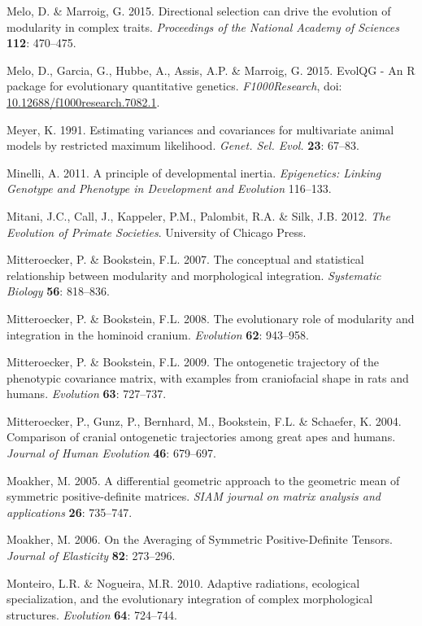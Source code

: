 \documentclass[12pt,twoside]{report}
\begin{document}
Melo, D. \& Marroig, G. 2015. Directional selection can drive the
evolution of modularity in complex traits. \emph{Proceedings of the
National Academy of Sciences} \textbf{112}: 470--475.

Melo, D., Garcia, G., Hubbe, A., Assis, A.P. \& Marroig, G. 2015. EvolQG
- An R package for evolutionary quantitative genetics.
\emph{F1000Research}, doi:
\href{http://dx.doi.org/10.12688/f1000research.7082.1}{10.12688/f1000research.7082.1}.

Meyer, K. 1991. Estimating variances and covariances for multivariate
animal models by restricted maximum likelihood. \emph{Genet. Sel. Evol.}
\textbf{23}: 67--83.

Minelli, A. 2011. A principle of developmental inertia.
\emph{Epigenetics: Linking Genotype and Phenotype in Development and
Evolution} 116--133.

Mitani, J.C., Call, J., Kappeler, P.M., Palombit, R.A. \& Silk, J.B.
2012. \emph{The Evolution of Primate Societies}. University of Chicago
Press.

Mitteroecker, P. \& Bookstein, F.L. 2007. The conceptual and statistical
relationship between modularity and morphological integration.
\emph{Systematic Biology} \textbf{56}: 818--836.

Mitteroecker, P. \& Bookstein, F.L. 2008. The evolutionary role of
modularity and integration in the hominoid cranium. \emph{Evolution}
\textbf{62}: 943--958.

Mitteroecker, P. \& Bookstein, F.L. 2009. The ontogenetic trajectory of
the phenotypic covariance matrix, with examples from craniofacial shape
in rats and humans. \emph{Evolution} \textbf{63}: 727--737.

Mitteroecker, P., Gunz, P., Bernhard, M., Bookstein, F.L. \& Schaefer,
K. 2004. Comparison of cranial ontogenetic trajectories among great apes
and humans. \emph{Journal of Human Evolution} \textbf{46}: 679--697.

Moakher, M. 2005. A differential geometric approach to the geometric
mean of symmetric positive-definite matrices. \emph{SIAM journal on
matrix analysis and applications} \textbf{26}: 735--747.

Moakher, M. 2006. On the Averaging of Symmetric Positive-Definite
Tensors. \emph{Journal of Elasticity} \textbf{82}: 273--296.

Monteiro, L.R. \& Nogueira, M.R. 2010. Adaptive radiations, ecological
specialization, and the evolutionary integration of complex
morphological structures. \emph{Evolution} \textbf{64}: 724--744.
\end{document}
